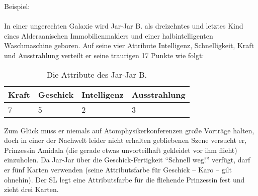Beispiel:
\\
\\
In einer ungerechten Galaxie wird Jar-Jar B. als dreizehntes und letztes Kind eines Alderaanischen Immobilienmaklers und einer halbintelligenten Waschmaschine geboren. Auf seine vier Attribute Intelligenz, Schnelligkeit, Kraft und Ausstrahlung verteilt er seine traurigen 17 Punkte wie folgt:
\begin{table}[H]
\caption{Die Attribute des Jar-Jar B.}
\begin{tabular}{|l|l|l|l|}
\hline
Kraft & Geschick & Intelligenz & Ausstrahlung \\
\hline
7 & 5 & 2 & 3\\
\hline
\end{tabular}
\end{table}
Zum Glück muss er niemals auf Atomphysikerkonferenzen große Vorträge halten, doch in einer der Nachwelt leider nicht erhalten gebliebenen Szene versucht er, Prinzessin Amidala (die gerade etwas unvorteilhaft gekleidet vor ihm flieht) einzuholen. Da Jar-Jar über die Geschick-Fertigkeit "`Schnell weg!"' verfügt, darf er fünf Karten verwenden (seine Attributsfarbe für Geschick -- Karo -- gilt ohnehin). Der SL legt eine Attributsfarbe für die fliehende Prinzessin fest und zieht drei Karten.

